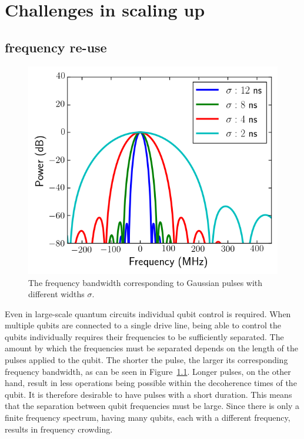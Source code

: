   \chapter{Challenges in scaling up}
    \label{ch:Muxmon chip architecture}

    \section{frequency re-use}
      \begin{figure}
        \begin{center}
        \vspace{-30pt}
          \includegraphics[width=\textwidth]{../Figures/Exploring frequency re-use/bandwidth_broadening.png}
        \end{center}
        \caption{The frequency bandwidth corresponding to Gaussian pulses with different widths $\sigma$.}
        \label{fig:bandwidth broadening}
        \vspace{-20pt}
      \end{figure}

      Even in large-scale quantum circuits individual qubit control is required. When multiple qubits are connected to a single drive line, being able to control the qubits individually requires their frequencies to be sufficiently separated. The amount by which the frequencies must be separated depends on the length of the pulses applied to the qubit. The shorter the pulse, the larger its corresponding frequency bandwidth, as can be seen in Figure~\ref{fig:bandwidth broadening}. Longer pulses, on the other hand, result in less operations being possible within the decoherence times of the qubit. It is therefore desirable to have pulses with a short duration. This means that the separation between qubit frequencies must be large. Since there is only a finite frequency spectrum, having many qubits, each with a different frequency, results in frequency crowding.

